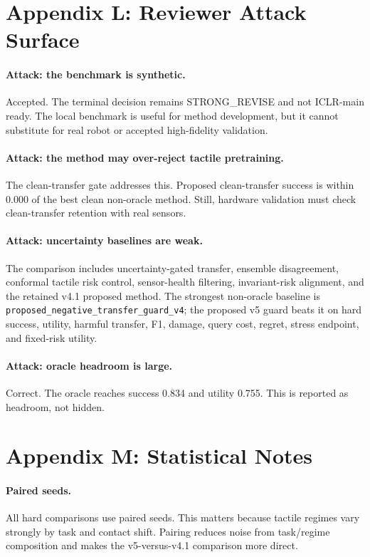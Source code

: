 \documentclass{article}
\begin{document}
\clearpage
\section{Appendix L: Reviewer Attack Surface}
\paragraph{Attack: the benchmark is synthetic.}
Accepted. The terminal decision remains STRONG\_REVISE and not ICLR-main ready. The local benchmark is useful for method development, but it cannot substitute for real robot or accepted high-fidelity validation.

\paragraph{Attack: the method may over-reject tactile pretraining.}
The clean-transfer gate addresses this. Proposed clean-transfer success is within 0.000 of the best clean non-oracle method. Still, hardware validation must check clean-transfer retention with real sensors.

\paragraph{Attack: uncertainty baselines are weak.}
The comparison includes uncertainty-gated transfer, ensemble disagreement, conformal tactile risk control, sensor-health filtering, invariant-risk alignment, and the retained v4.1 proposed method. The strongest non-oracle baseline is \texttt{proposed\_negative\_transfer\_guard\_v4}; the proposed v5 guard beats it on hard success, utility, harmful transfer, F1, damage, query cost, regret, stress endpoint, and fixed-risk utility.

\paragraph{Attack: oracle headroom is large.}
Correct. The oracle reaches success 0.834 and utility 0.755. This is reported as headroom, not hidden.

\clearpage
\section{Appendix M: Statistical Notes}
\paragraph{Paired seeds.}
All hard comparisons use paired seeds. This matters because tactile regimes vary strongly by task and contact shift. Pairing reduces noise from task/regime composition and makes the v5-versus-v4.1 comparison more direct.
\end{document}
